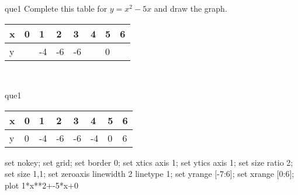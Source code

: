 \documentclass[13.5pt, varwidth=true]{beamer}
\begin{document}
\begin{frame}[shrink=19,fragile]
	\begin{beamercolorbox}[rounded=true, left, shadow=true,wd=14.8cm]{que1}
		 Complete this table for $y = x^{2} - 5x$ and draw the graph. \\[0.3cm] \renewcommand{\arraystretch}{1.2}\begin{tabular}{|C|C|C|C|C|C|C|C|} \hline x & 0 & 1 & 2 & 3 & 4 & 5 & 6 \\ \hline y &  & -4 & -6 & -6 &  & 0 & \\ \hline \end{tabular}\\[0.3cm]
	\end{beamercolorbox}
\end{frame}
\begin{frame}[shrink=19,fragile]
	\begin{beamercolorbox}[rounded=true, left, shadow=true,wd=14.8cm]{que1}
		\renewcommand{\arraystretch}{1.2}\begin{tabular}{|C|C|C|C|C|C|C|C|} \hline x & 0 & 1 & 2 & 3 & 4 & 5 & 6 \\ \hline y & 0 & -4 & -6 & -6 & -4 & 0 & 6\\ \hline \end{tabular}\begin{gnuplot}[terminal=pdf] set nokey; set grid; set border 0; set xtics axis 1; set ytics axis 1; set size ratio 2; set size 1,1; set zeroaxis linewidth 2 linetype 1; set yrange [-7:6]; set xrange [0:6]; plot 1*x**2+-5*x+0 \end{gnuplot}
	\end{beamercolorbox}
\end{frame}
\end{document}
